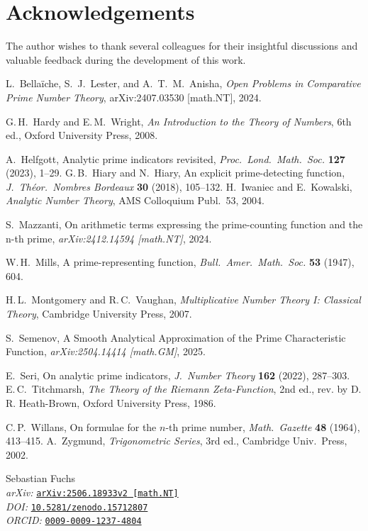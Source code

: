 \documentclass[11pt,a4paper]{amsart}
\theoremstyle{plain}
\theoremstyle{definition}
\begin{document}
\appendix
\section{Acknowledgements}
The author wishes to thank several colleagues for their insightful discussions and valuable feedback during the development of this work.
\begin{thebibliography}{13}

L.~Bellaïche, S.~J.~Lester, and A.~T.~M.~Anisha, \emph{Open Problems in Comparative Prime Number Theory}, arXiv:2407.03530 [math.NT], 2024.

G.\,H.~Hardy and E.\,M.~Wright, \emph{An Introduction to the Theory of Numbers}, 6th ed., Oxford University Press, 2008.

A.~Helfgott, Analytic prime indicators revisited, \emph{Proc.\ Lond.\ Math.\ Soc.} \textbf{127} (2023), 1–29.
G.\,B.~Hiary and N.~Hiary, An explicit prime-detecting function, \emph{J.\ Théor.\ Nombres Bordeaux} \textbf{30} (2018), 105–132.
H.~Iwaniec and E.~Kowalski, \emph{Analytic Number Theory}, AMS Colloquium Publ.\ 53, 2004.

S.~Mazzanti, On arithmetic terms expressing the prime-counting function and the n-th prime, \emph{arXiv:2412.14594 [math.NT]}, 2024.

W.\,H.~Mills, A prime-representing function, \emph{Bull.\ Amer.\ Math.\ Soc.} \textbf{53} (1947), 604.

H.\,L.~Montgomery and R.\,C.~Vaughan, \emph{Multiplicative Number Theory I: Classical Theory}, Cambridge University Press, 2007.

S.~Semenov, A Smooth Analytical Approximation of the Prime Characteristic Function, \emph{arXiv:2504.14414 [math.GM]}, 2025.

E.~Seri, On analytic prime indicators, \emph{J.\ Number Theory} \textbf{162} (2022), 287–303.
E.\,C.~Titchmarsh, \emph{The Theory of the Riemann Zeta-Function}, 2nd ed., rev.
by D. R. Heath-Brown, Oxford University Press, 1986.

C.\,P.~Willans, On formulae for the $n$-th prime number, \emph{Math.\ Gazette} \textbf{48} (1964), 413–415.
A.~Zygmund, \emph{Trigonometric Series}, 3rd ed., Cambridge Univ.\ Press, 2002.

\end{thebibliography}

\vfill
\par\noindent
\small
Sebastian Fuchs \\[1ex]
\textit{arXiv:} \texttt{\href{https://arxiv.org/abs/2506.18933}{arXiv:2506.18933v2 [math.NT]}} \\
\textit{DOI:} \texttt{\href{https://doi.org/10.5281/zenodo.15712807}{10.5281/zenodo.15712807}} \\ 
\textit{ORCID:} \texttt{\href{https://orcid.org/0009-0009-1237-4804}{0009-0009-1237-4804}} \\
\end{document}

